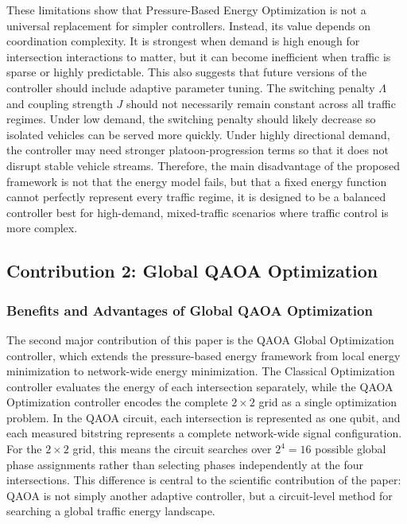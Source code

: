 \documentclass[12pt]{article}
\begin{document}
These limitations show that Pressure-Based Energy Optimization is not a universal replacement for simpler controllers. Instead, its value depends on coordination complexity. It is strongest when demand is high enough for intersection interactions to matter, but it can become inefficient when traffic is sparse or highly predictable. This also suggests that future versions of the controller should include adaptive parameter tuning. The switching penalty $\Lambda$ and coupling strength $J$ should not necessarily remain constant across all traffic regimes. Under low demand, the switching penalty should likely decrease so isolated vehicles can be served more quickly. Under highly directional demand, the controller may need stronger platoon-progression terms so that it does not disrupt stable vehicle streams. Therefore, the main disadvantage of the proposed framework is not that the energy model fails, but that a fixed energy function cannot perfectly represent every traffic regime, it is designed to be a balanced controller best for high-demand, mixed-traffic scenarios where traffic control is more complex.

\subsection{Contribution 2: Global QAOA Optimization}

\subsubsection{Benefits and Advantages of Global QAOA Optimization}

The second major contribution of this paper is the QAOA Global Optimization controller, which extends the pressure-based energy framework from local energy minimization to network-wide energy minimization. The Classical Optimization controller evaluates the energy of each intersection separately, while the QAOA Optimization controller encodes the complete $2 \times 2$ grid as a single optimization problem. In the QAOA circuit, each intersection is represented as one qubit, and each measured bitstring represents a complete network-wide signal configuration. For the $2 \times 2$ grid, this means the circuit searches over $2^4=16$ possible global phase assignments rather than selecting phases independently at the four intersections. This difference is central to the scientific contribution of the paper: QAOA is not simply another adaptive controller, but a circuit-level method for searching a global traffic energy landscape.
\end{document}
